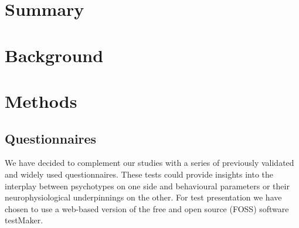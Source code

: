 
\chapter{Summary}
\readme
\chapter{Background}
    \section{}
\chapter{Methods}
    \section{Questionnaires}
	We have decided to complement our studies with a series of previously validated and widely used questionnaires.
	These tests could provide insights into the interplay between psychotypes on one side and behavioural parameters or their neurophysiological underpinnings on the other.
	For test presentation we have chosen to use a web-based version of the free and open source (FOSS) software testMaker\cite{testmaker}.
	
